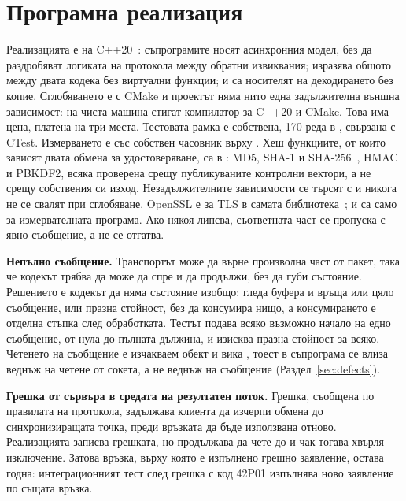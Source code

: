\section{Програмна реализация}
\label{sec:implementation}

Реализацията е на C++20~\cite{iso_cpp20}: съпрограмите носят асинхронния модел, без да
раздробяват логиката на протокола между обратни извиквания;  изразява общото
между двата кодека без виртуални функции;  и  са
носителят на декодирането без копие. Сглобяването е с CMake и проектът няма нито една
задължителна външна зависимост: на чиста машина стигат компилатор за C++20 и CMake. Това има
цена, платена на три места. Тестовата
рамка е собствена, 170 реда в , свързана с CTest. Измерването е със
собствен часовник върху . Хеш функциите, от които зависят
двата обмена за удостоверяване, са в : MD5, SHA-1 и SHA-256~\cite{fips180},
HMAC и PBKDF2, всяка проверена срещу публикуваните контролни вектори, а не срещу собствения си
изход. Незадължителните зависимости се търсят с  и никога не се
свалят при сглобяване. OpenSSL е за TLS в самата библиотека~\cite{openssl};  и
 са само за измервателната програма. Ако някоя липсва, съответната част се
пропуска с явно съобщение, а не се отгатва.

\textbf{Непълно съобщение.} Транспортът може да върне произволна част от пакет, така че
кодекът трябва да може да спре и да продължи, без да губи състояние. Решението е кодекът да
няма състояние изобщо:  гледа буфера и връща или цяло съобщение, или празна
стойност, без да консумира нищо, а консумирането е отделна стъпка след обработката. Тестът
 подава всяко възможно начало на
едно съобщение, от нула до пълната дължина, и изисква празна стойност за всяко. Четенето на
съобщение е изчакваем обект и  вика , тоест в съпрограма
се влиза веднъж на четене от сокета, а не веднъж на съобщение (Раздел~\ref{sec:defects}).

\textbf{Грешка от сървъра в средата на резултатен поток.} Грешка, съобщена по правилата на
протокола, задължава клиента да изчерпи обмена до синхронизиращата точка, преди връзката да
бъде използвана отново. Реализацията записва грешката, но продължава да чете до
 и чак тогава хвърля изключение. Затова връзка, върху която е изпълнено
грешно заявление, остава годна: интеграционният тест
 след грешка с код 42P01
изпълнява ново заявление по същата връзка.

